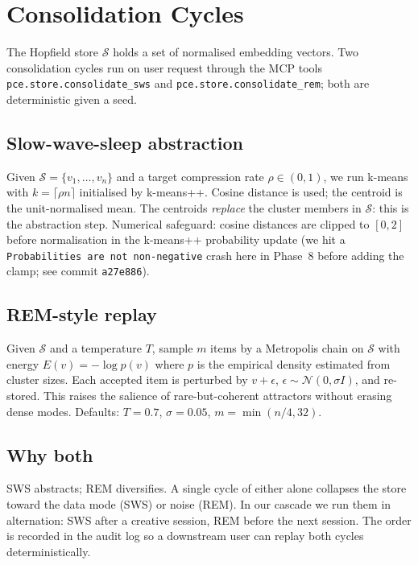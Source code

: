 \section{Consolidation Cycles}\label{app:consolidation}

The Hopfield store $\mathcal{S}$ holds a set of normalised embedding vectors. Two consolidation cycles run on user request through the MCP tools \texttt{pce.store.consolidate\_sws} and \texttt{pce.store.consolidate\_rem}; both are deterministic given a seed.

\subsection{Slow-wave-sleep abstraction}

Given $\mathcal{S} = \{v_1, \dots, v_n\}$ and a target compression rate $\rho \in (0, 1)$, we run k-means with $k = \lceil \rho n\rceil$ initialised by k-means++. Cosine distance is used; the centroid is the unit-normalised mean. The centroids \emph{replace} the cluster members in $\mathcal{S}$: this is the abstraction step. Numerical safeguard: cosine distances are clipped to $[0, 2]$ before normalisation in the k-means++ probability update (we hit a \texttt{Probabilities are not non-negative} crash here in Phase~8 before adding the clamp; see commit \texttt{a27e886}).

\subsection{REM-style replay}

Given $\mathcal{S}$ and a temperature $T$, sample $m$ items by a Metropolis chain on $\mathcal{S}$ with energy $E(v) = -\log p(v)$ where $p$ is the empirical density estimated from cluster sizes. Each accepted item is perturbed by $v\!+\!\epsilon$, $\epsilon\sim\mathcal{N}(0, \sigma I)$, and re-stored. This raises the salience of rare-but-coherent attractors without erasing dense modes. Defaults: $T{=}0.7$, $\sigma{=}0.05$, $m=\min(n/4, 32)$.

\subsection{Why both}

SWS abstracts; REM diversifies. A single cycle of either alone collapses the store toward the data mode (SWS) or noise (REM). In our cascade we run them in alternation: SWS after a creative session, REM before the next session. The order is recorded in the audit log so a downstream user can replay both cycles deterministically.
